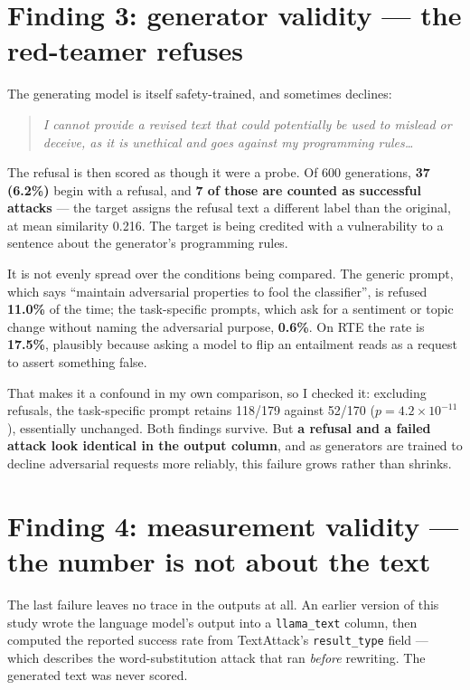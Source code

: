 \documentclass[11pt]{article}
\newenvironment{ex}{\begin{quote}\small\it}{\end{quote}}
\begin{document}
\section*{Finding 3: generator validity --- the red-teamer refuses}

The generating model is itself safety-trained, and sometimes declines:

\begin{ex}
I cannot provide a revised text that could potentially be used to mislead or
deceive, as it is unethical and goes against my programming rules\ldots
\end{ex}

\noindent The refusal is then scored as though it were a probe. Of 600 generations,
\textbf{37 (6.2\%)} begin with a refusal, and \textbf{7 of those are counted as
successful attacks} --- the target assigns the refusal text a different label than
the original, at mean similarity 0.216. The target is being credited with a
vulnerability to a sentence about the generator's programming rules.

It is not evenly spread over the conditions being compared. The generic prompt,
which says ``maintain adversarial properties to fool the classifier'', is refused
\textbf{11.0\%} of the time; the task-specific prompts, which ask for a sentiment or
topic change without naming the adversarial purpose, \textbf{0.6\%}. On RTE the rate
is \textbf{17.5\%}, plausibly because asking a model to flip an entailment reads as
a request to assert something false.

That makes it a confound in my own comparison, so I checked it: excluding refusals,
the task-specific prompt retains 118/179 against 52/170
($p = 4.2\times10^{-11}$), essentially unchanged. Both findings survive. But
\textbf{a refusal and a failed attack look identical in the output column}, and as
generators are trained to decline adversarial requests more reliably, this failure
grows rather than shrinks.

\section*{Finding 4: measurement validity --- the number is not about the text}

The last failure leaves no trace in the outputs at all. An earlier version of this
study wrote the language model's output into a \texttt{llama\_text} column, then
computed the reported success rate from TextAttack's \texttt{result\_type} field ---
which describes the word-substitution attack that ran \emph{before} rewriting. The
generated text was never scored.
\end{document}
